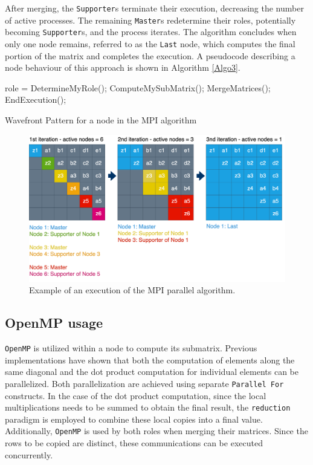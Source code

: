 After merging, the \texttt{Supporter}s terminate their execution, decreasing the number of active processes. The remaining \texttt{Master}s redetermine their roles, potentially becoming \texttt{Supporter}s, and the process iterates. The algorithm concludes when only one node remains, referred to as the \texttt{Last} node, which computes the final portion of the matrix and completes the execution. A pseudocode describing a node behaviour of this approach is shown in Algorithm \ref{Algo3}.

\begin{algorithm}
\begin{algorithmic}
    \STATE role = DetermineMyRole();
    \STATE ComputeMySubMatrix();
        \STATE MergeMatrices();
    \ENDIF
        \STATE EndExecution();
    \ENDIF
\ENDWHILE
\end{algorithmic}
\caption{Wavefront Pattern for a node in the MPI algorithm}
\label{Algo3}
\end{algorithm}


\begin{figure}[h]
    \centering\includegraphics[scale=0.30]{img/MPI/DivideEtImpera.drawio.png}
    
    \caption{Example of an execution of the MPI parallel algorithm.}
\end{figure}


\subsection*{OpenMP usage}
\texttt{OpenMP} is utilized within a node to compute its submatrix. Previous implementations have shown that both the computation of elements along the same diagonal and the dot product computation for individual elements can be parallelized. Both parallelization are achieved using separate \texttt{Parallel For} constructs. In the case of the dot product computation, since the local multiplications needs to be summed to obtain the final result, the \texttt{reduction} paradigm is employed to combine these local copies into a final value. Additionally, \texttt{OpenMP} is used by both roles when merging their matrices. Since the rows to be copied are distinct, these communications can be executed concurrently.

